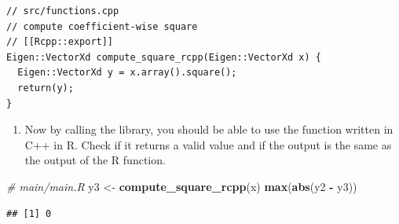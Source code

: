 \documentclass[]{book}
\newenvironment{Shaded}{\begin{snugshade}}{\end{snugshade}}
\newcommand{\KeywordTok}[1]{\textcolor[rgb]{0.13,0.29,0.53}{\textbf{#1}}}
\newcommand{\StringTok}[1]{\textcolor[rgb]{0.31,0.60,0.02}{#1}}
\newcommand{\CommentTok}[1]{\textcolor[rgb]{0.56,0.35,0.01}{\textit{#1}}}
\newcommand{\OperatorTok}[1]{\textcolor[rgb]{0.81,0.36,0.00}{\textbf{#1}}}
\newcommand{\NormalTok}[1]{#1}
\providecommand{\tightlist}{%
  \setlength{\itemsep}{0pt}\setlength{\parskip}{0pt}}
\begin{document}
\begin{verbatim}
// src/functions.cpp
// compute coefficient-wise square
// [[Rcpp::export]]
Eigen::VectorXd compute_square_rcpp(Eigen::VectorXd x) {
  Eigen::VectorXd y = x.array().square();
  return(y);
}
\end{verbatim}

\begin{enumerate}
\def\labelenumi{\arabic{enumi}.}
\setcounter{enumi}{10}
\tightlist
\item
  Now by calling the library, you should be able to use the function
  written in C++ in R. Check if it returns a valid value and if the
  output is the same as the output of the R function.
\end{enumerate}

\begin{Shaded}
\begin{Highlighting}[]
\CommentTok{# main/main.R}
\NormalTok{y3 <-}\StringTok{ }\KeywordTok{compute_square_rcpp}\NormalTok{(x)}
\KeywordTok{max}\NormalTok{(}\KeywordTok{abs}\NormalTok{(y2 }\OperatorTok{-}\StringTok{ }\NormalTok{y3))}
\end{Highlighting}
\end{Shaded}

\begin{verbatim}
## [1] 0
\end{verbatim}
\end{document}

